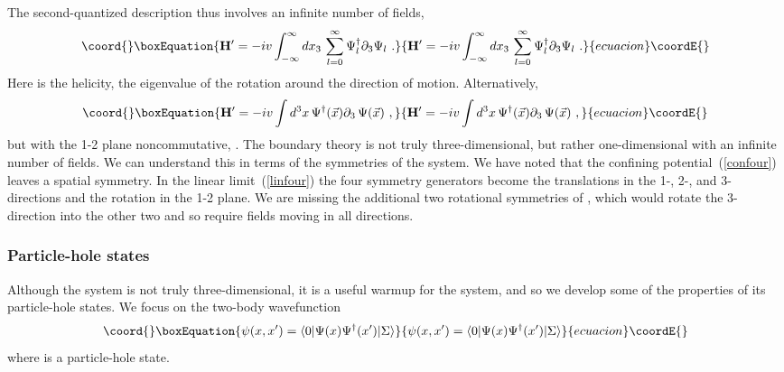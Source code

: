 \documentclass[a4paper,12pt]{article}
\providecommand{\R}{R}
\begin{document}
The second-quantized description thus involves an infinite number of
fields,
\begin{equation}\coord{}\boxEquation{
{\bf H}'
= -iv \int_{-\infty}^\infty dx_3\, \sum_{l=0}^\infty \Psi_l^\dagger
\partial_3
\Psi_l\ .
}{
{\bf H}'
= -iv \int_{-\infty}^\infty dx_3\, \sum_{l=0}^\infty \Psi_l^\dagger
\partial_3
\Psi_l\ .
}{ecuacion}\coordE{}\end{equation}
Here \coordHE{} is the helicity, the eigenvalue of the
rotation \coordHE{} around the direction of motion.
Alternatively,
\begin{equation}\coord{}\boxEquation{
{\bf H}' = - i v \int  d^3x\, \Psi^\dagger(\vec x)  \partial_3 \,
\Psi(\vec x)\ ,
}{
{\bf H}' = - i v \int  d^3x\, \Psi^\dagger(\vec x)  \partial_3 \,
\Psi(\vec x)\ ,
}{ecuacion}\coordE{}\end{equation}
but with the 1-2 plane noncommutative, \coordHE{}.
The boundary theory is not truly three-dimensional, but rather
one-dimensional with an infinite number of fields.  We can understand this
in terms of the symmetries of the system.  We have noted that the
confining potential~(\ref{confour}) leaves a \coordHE{} spatial symmetry.  In
the linear limit~(\ref{linfour}) the four symmetry generators become the
translations in the 1-, 2-, and 3-directions and the rotation in the 1-2
plane.  We are missing the additional two rotational symmetries of
\myHighlight{$\R^3$}\coordHE{}, which would rotate the 3-direction into the other two and so require
fields moving in all directions.


\subsubsection{Particle-hole states}

Although the \coordHE{} system is not truly three-dimensional, it is a useful
warmup for the \coordHE{} system, and so we develop some of the properties of
its particle-hole states.  We focus on the two-body wavefunction
\begin{equation}\coord{}\boxEquation{
\psi(x,x') = \langle 0|  \Psi (x)  \Psi^\dagger(x') | \Sigma\rangle
}{
\psi(x,x') = \langle 0|  \Psi (x)  \Psi^\dagger(x') | \Sigma\rangle
}{ecuacion}\coordE{}\end{equation}
where \myHighlight{$| \Sigma\rangle$}\coordHE{} is a particle-hole state.
\end{document}
